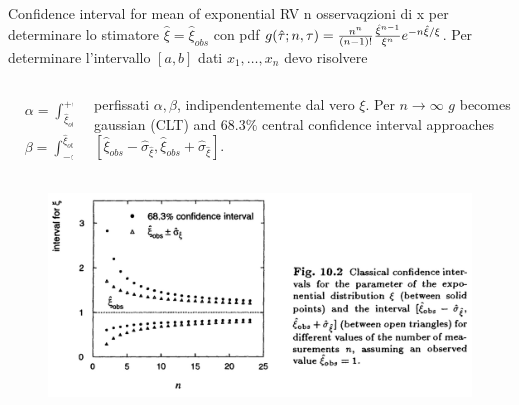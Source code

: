 \documentclass[asd-beamer.tex]{subfiles}
\begin{document}
\begin{frame}{Confidence interval for mean of exponential RV}
n osservaqzioni di x per determinare lo stimatore $\hat{\xi}=\hat{\xi}_{obs}$ con pdf $g(\hat{\tau};n,\tau)=\frac{n^n}{(n-1)!}\frac{\hat{\xi}^{n-1}}{\xi^n}e^{-n\hat{\xi}/\xi}$. Per determinare l'intervallo $[a,b]$ dati $x_1,\ldots,x_n$ devo risolvere
\begin{columns}[T]\begin{column}{0.4\textwidth}
\begin{align*}
&\alpha=\int_{\hat{\xi}_{obs}}^{+\infty}g(\hat{\xi};a)\,d\hat{\xi}\\
&\beta=\int_{-\infty}^{\hat{\xi}_{obs}}g(\hat{\xi};b)\,d\hat{\xi}
\end{align*}
\end{column}
\begin{column}{0.6\textwidth}
perfissati $\alpha,\beta$, indipendentemente dal vero $\xi$. Per $n\to\infty$ $g$ becomes gaussian (CLT) and $68.3\%$ central confidence interval approaches $[\hat{\xi}_{obs}-\hat{\sigma}_{\hat{\xi}},\hat{\xi}_{obs}+\hat{\sigma}_{\hat{\xi}}]$.
\end{column}
\end{columns}
\begin{figure}[!ht]\includegraphics[trim={0cm 0cm 0 0},clip, keepaspectratio,height=0.4\textheight]{figures/cowan/estimators/intestclt}\label{fig:intestclt}\end{figure}
\end{frame}
\end{document}
